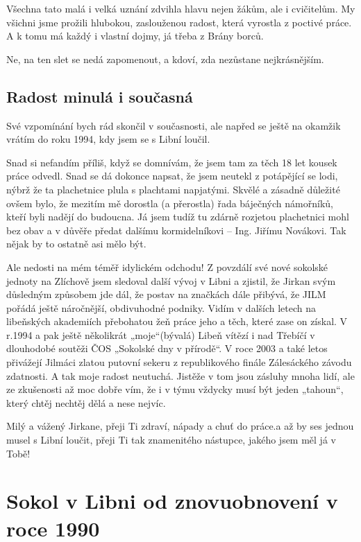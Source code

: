 Všechna tato malá i velká uznání zdvihla hlavu nejen žákům, ale i
cvičitelům. My všichni jsme prožili hlubokou, zaslouženou radost, která
vyrostla z poctivé práce. A k tomu má každý i vlastní dojmy, já třeba z
Brány borců.

Ne, na ten slet se nedá zapomenout, a kdoví, zda nezůstane
nejkrásnějším.

\subsection{Radost minulá i
současná}\label{radost-minuluxe1-i-souux10dasnuxe1}

Své vzpomínání bych rád skončil v současnosti, ale napřed se ještě na
okamžik vrátím do roku 1994, kdy jsem se s Libní loučil.

Snad si nefandím příliš, když se domnívám, že jsem tam za těch 18 let
kousek práce odvedl. Snad se dá dokonce napsat, že jsem neutekl z
potápějící se lodi, nýbrž že ta plachetnice plula s plachtami napjatými.
Skvělé a zásadně důležité ovšem bylo, že mezitím mě dorostla (a
přerostla) řada báječných námořníků, kteří byli nadějí do budoucna. Já
jsem tudíž tu zdárně rozjetou plachetnici mohl bez obav a v důvěře
předat dalšímu kormidelníkovi -- Ing. Jiřímu Novákovi. Tak nějak by to
ostatně asi mělo být.

Ale nedosti na mém téměř idylickém odchodu! Z povzdálí své nové sokolské
jednoty na Zlíchově jsem sledoval další vývoj v Libni a zjistil, že
Jirkan svým důsledným způsobem jde dál, že postav na značkách dále
přibývá, že JILM pořádá ještě náročnější, obdivuhodné podniky. Vidím v
dalších letech na libeňských akademiích přebohatou žeň práce jeho a
těch, které zase on získal. V r.1994 a pak ještě několikrát
„moje``(bývalá) Libeň vítězí i nad Třebíčí v dlouhodobé soutěži ČOS
„Sokolské dny v přírodě``. V roce 2003 a také letos přivážejí Jilmáci
zlatou putovní sekeru z republikového finále Zálesáckého závodu
zdatnosti. A tak moje radost neutuchá. Jistěže v tom jsou zásluhy mnoha
lidí, ale ze zkušenosti až moc dobře vím, že i v týmu vždycky musí být
jeden „tahoun``, který chtěj nechtěj dělá a nese nejvíc.

Milý a vážený Jirkane, přeji Ti zdraví, nápady a chuť do práce.a až by
ses jednou musel s Libní loučit, přeji Ti tak znamenitého nástupce,
jakého jsem měl já v Tobě!

\section{\texorpdfstring{Sokol v Libni od znovuobnovení v roce 1990
}{Sokol v Libni od znovuobnovení v roce 1990 }}\label{sokol-v-libni-od-znovuobnovenuxed-v-roce-1990}

